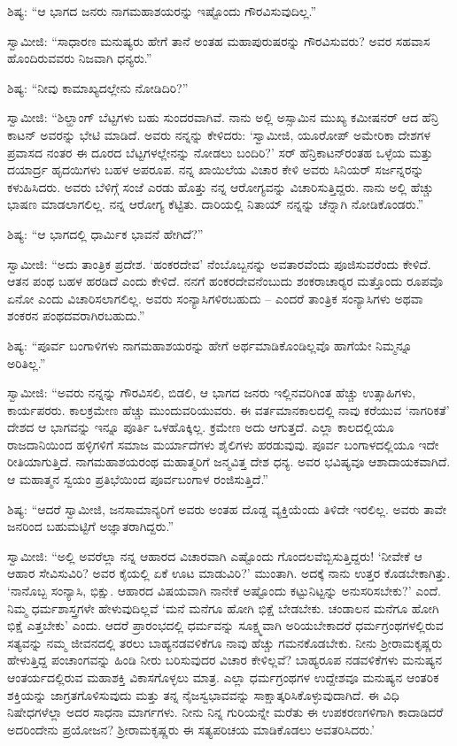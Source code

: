  ಶಿಷ್ಯ: “ಆ ಭಾಗದ ಜನರು ನಾಗಮಹಾಶಯರನ್ನು ಇಷ್ಟೊಂದು ಗೌರವಿಸುವುದಿಲ್ಲ.” 

 ಸ್ವಾಮೀಜಿ: “ಸಾಧಾರಣ ಮನುಷ್ಯರು ಹೇಗೆ ತಾನೆ ಅಂತಹ ಮಹಾಪುರುಷರನ್ನು ಗೌರವಿಸುವರು? ಅವರ ಸಹವಾಸ ಹೊಂದಿರುವವರು ನಿಜವಾಗಿ ಧನ್ಯರು.” 

 ಶಿಷ್ಯ: “ನೀವು ಕಾಮಾಖ್ಯದಲ್ಲೇನು ನೋಡಿದಿರಿ?” 

 ಸ್ವಾಮೀಜಿ: “ಶಿಲ್ಹಾಂಗ್ ಬೆಟ್ಟಗಳು ಬಹು ಸುಂದರವಾಗಿವೆ. ನಾನು ಅಲ್ಲಿ ಅಸ್ಸಾಮಿನ ಮುಖ್ಯ ಕಮೀಷನರ್ ಆದ ಹೆನ್ರಿ ಕಾಟನ್ ಅವರನ್ನು ಭೇಟಿ ಮಾಡಿದೆ. ಅವರು ನನ್ನನ್ನು ಕೇಳಿದರು: ‘ಸ್ವಾಮೀಜಿ, ಯೂರೋಪ್ ಅಮೇರಿಕಾ ದೇಶಗಳ ಪ್ರವಾಸದ ನಂತರ ಈ ದೂರದ ಬೆಟ್ಟಗಳಲ್ಲೇನನ್ನು ನೋಡಲು ಬಂದಿರಿ?’ ಸರ್ ಹೆನ್ರಿಕಾಟನ್‍ರಂತಹ ಒಳ್ಳೆಯ ಮತ್ತು ದಯಾರ್ದ್ರ ಹೃದಯಿಗಳು ಬಹಳ ಅಪರೂಪ. ನನ್ನ ಖಾಯಿಲೆಯ ವಿಚಾರ ಕೇಳಿ ಅವರು ಸಿನಿಯರ್ ಸರ್ಜನ್ನರನ್ನು ಕಳುಹಿಸಿದರು. ಅವರು ಬೆಳಿಗ್ಗೆ ಸಂಜೆ ಎರಡು ಹೊತ್ತು ನನ್ನ ಆರೋಗ್ಯವನ್ನು ವಿಚಾರಿಸುತ್ತಿದ್ದರು. ನಾನು ಅಲ್ಲಿ ಹೆಚ್ಚು ಭಾಷಣ ಮಾಡಲಾಗಲಿಲ್ಲ. ನನ್ನ ಆರೋಗ್ಯ ಕೆಟ್ಟಿತು. ದಾರಿಯಲ್ಲಿ ನಿತಾಯ್ ನನ್ನನ್ನು ಚೆನ್ನಾಗಿ ನೋಡಿಕೊಂಡರು.” 

 ಶಿಷ್ಯ: “ಆ ಭಾಗದಲ್ಲಿ ಧಾರ್ಮಿಕ ಭಾವನೆ ಹೇಗಿದೆ?” 

 ಸ್ವಾಮೀಜಿ: “ಅದು ತಾಂತ್ರಿಕ ಪ್ರದೇಶ. ‘ಹಂಕರದೇವ’ ನೆಂಬೊಬ್ಬನನ್ನು ಅವತಾರವೆಂದು ಪೂಜಿಸುವರೆಂದು ಕೇಳಿದೆ. ಆತನ ಪಂಥ ಬಹಳ ಹರಡಿದೆ ಎಂದು ಕೇಳಿದೆ. ನನಗೆ ಹಂಕರದೇವನೆಂಬುದು ಶಂಕರಾಚಾರ‍್ಯರ ಮತ್ತೊಂದು ರೂಪವೊ ಏನೋ ಎಂದು ವಿಚಾರಿಸಲಾಗಲಿಲ್ಲ. ಅವರು ಸಂನ್ಯಾಸಿಗಳಿರಬಹುದು – ಎಂದರೆ ತಾಂತ್ರಿಕ ಸಂನ್ಯಾಸಿಗಳು ಅಥವಾ ಶಂಕರನ ಪಂಥದವರಾಗಿರಬಹುದು.” 

 ಶಿಷ್ಯ: “ಪೂರ್ವ ಬಂಗಾಳಿಗಳು ನಾಗಮಹಾಶಯರನ್ನು ಹೇಗೆ ಅರ್ಥಮಾಡಿಕೊಂಡಿಲ್ಲವೊ ಹಾಗೆಯೇ ನಿಮ್ಮನ್ನೂ ಅರಿತಿಲ್ಲ.” 

 ಸ್ವಾಮೀಜಿ: “ಅವರು ನನ್ನನ್ನು ಗೌರವಿಸಲಿ, ಬಿಡಲಿ, ಆ ಭಾಗದ ಜನರು ಇಲ್ಲಿನವರಿಗಿಂತ ಹೆಚ್ಚು ಉತ್ಸಾಹಿಗಳು, ಕಾರ್ಯಪರರು. ಕಾಲಕ್ರಮೇಣ ಹೆಚ್ಚು ಮುಂದುವರಿಯುವರು. ಈ ವರ್ತಮಾನಕಾಲದಲ್ಲಿ ನಾವು ಕರೆಯುವ ‘ನಾಗರಿಕತೆ’ ದೇಶದ ಆ ಭಾಗವನ್ನು ಇನ್ನೂ ಪೂರ್ತಿ ಒಳಹೊಕ್ಕಿಲ್ಲ. ಕ್ರಮೇಣ ಅದು ಆಗುತ್ತದೆ. ಎಲ್ಲಾ ಕಾಲದಲ್ಲಿಯೂ ರಾಜದಾನಿಯಿಂದ ಹಳ್ಳಿಗಳಿಗೆ ಸಮಾಜ ಮರ್ಯಾದೆಗಳು ಶೈಲಿಗಳು ಹರಡುವುವು. ಪೂರ್ವ ಬಂಗಾಳದಲ್ಲಿಯೂ ಇದೇ ರೀತಿಯಾಗುತ್ತಿದೆ. ನಾಗಮಹಾಶಯರಂಥ ಮಹಾತ್ಮರಿಗೆ ಜನ್ಮವಿತ್ತ ದೇಶ ಧನ್ಯ. ಅವರ ಭವಿಷ್ಯವೂ ಆಶಾದಾಯಕವಾಗಿದೆ. ಆ ಮಹಾತ್ಮನ ಸ್ವಯಂ ಪ್ರತಿಭೆಯಿಂದ ಪೂರ್ವಬಂಗಾಳ ರಂಜಿಸುತ್ತಿದೆ.” 

 ಶಿಷ್ಯ: “ಆದರೆ ಸ್ವಾಮೀಜಿ, ಜನಸಾಮಾನ್ಯರಿಗೆ ಅವರು ಅಂತಹ ದೊಡ್ಡ ವ್ಯಕ್ತಿಯೆಂದು ತಿಳಿದೇ ಇರಲಿಲ್ಲ. ಅವರು ತಾವೇ ಜನರಿಂದ ಬಹುಮಟ್ಟಿಗೆ ಅಜ್ಞಾತರಾಗಿದ್ದರು.” 

 ಸ್ವಾಮೀಜಿ: “ಅಲ್ಲಿ ಅವರೆಲ್ಲಾ ನನ್ನ ಆಹಾರದ ವಿಚಾರವಾಗಿ ಎಷ್ಟೊಂದು ಗೊಂದಲವೆಬ್ಬಿಸುತ್ತಿದ್ದರು! ‘ನೀವೇಕೆ ಆ ಆಹಾರ ಸೇವಿಸುವಿರಿ? ಅವರ ಕೈಯಲ್ಲಿ ಏಕೆ ಊಟ ಮಾಡುವಿರಿ?’ ಮುಂತಾಗಿ. ಅದಕ್ಕೆ ನಾನು ಉತ್ತರ ಕೊಡಬೇಕಾಗಿತ್ತು. ‘ನಾನೊಬ್ಬ ಸಂನ್ಯಾಸಿ, ಭಿಕ್ಷು. ಆಹಾರದ ವಿಷಯವಾಗಿ ನಾನೇಕೆ ಅಷ್ಟೊಂದು ಕಟ್ಟುನಿಟ್ಟನ್ನು ಅನುಸರಿಸಬೇಕು?’ ಎಂದೆ. ನಿಮ್ಮ ಧರ್ಮಶಾಸ್ತ್ರಗಳೇ ಹೇಳುವುದಿಲ್ಲವೆ ‘ಮನೆ ಮನೆಗೂ ಹೋಗಿ ಭಿಕ್ಷೆ ಬೇಡಬೇಕು. ಚಂಡಾಲನ ಮನೆಗೂ ಹೋಗಿ ಭಿಕ್ಷೆ ಎತ್ತಬೇಕು’ ಎಂದು. ಆದರೆ ಪ್ರಾರಂಭದಲ್ಲಿ ಧರ್ಮವನ್ನು ಸೂಕ್ಷ್ಮವಾಗಿ ಅರಿಯಬೇಕಾದರೆ ಧರ್ಮಗ್ರಂಥಗಳಲ್ಲಿರುವ ಸತ್ಯವನ್ನು ನಮ್ಮ ಜೀವನದಲ್ಲಿ ತರಲು ಬಾಹ್ಯನಡವಳಿಕೆಗೂ ನಾವು ಹೆಚ್ಚು ಗಮನಕೊಡಬೇಕು. ನೀನು ಶ‍್ರೀರಾಮಕೃಷ್ಣರು ಹೇಳುತ್ತಿದ್ದ ಪಂಚಾಂಗವನ್ನು ಹಿಂಡಿ ನೀರು ಬರಿಸುವುದರ ವಿಚಾರ ಕೇಳಿಲ್ಲವೆ? ಬಾಹ್ಯರೂಪ ನಡವಳಿಕೆಗಳು ಮನುಷ್ಯನ ಆಂತರ್ಯದಲ್ಲಿರುವ ಮಹಾಶಕ್ತಿ ವಿಕಾಸಗೊಳ್ಳಲು ಮಾತ್ರ. ಎಲ್ಲಾ ಧರ್ಮಗ್ರಂಥಗಳ ಉದ್ದೇಶವೂ‌ ಮನುಷ್ಯನ ಆಂತರಿಕ ಶಕ್ತಿಯನ್ನು ಜಾಗ್ರತಗೊಳಿಸುವುದು ಮತ್ತು ತನ್ನ ನೈಜಸ್ವಭಾವವನ್ನು ಸಾಕ್ಷಾತ್ಕರಿಸಿಕೊಳ್ಳುವುದಾಗಿದೆ. ಈ ವಿಧಿ ನಿಷೇಧಗಳೆಲ್ಲಾ ಅದರ ಸಾಧನಾ ಮಾರ್ಗಗಳು. ನೀನು ನಿನ್ನ ಗುರಿಯನ್ನೇ ಮರೆತು ಈ ಉಪಕರಣಗಳಿಗಾಗಿ ಕಾದಾಡಿದರೆ ಅದರಿಂದೇನು ಪ್ರಯೋಜನ? ಶ‍್ರೀರಾಮಕೃಷ್ಣರು ಈ ಸತ್ಯಪರಿಚಯ ಮಾಡಿಕೊಡಲು ಅವತರಿಸಿದರು.’ 

